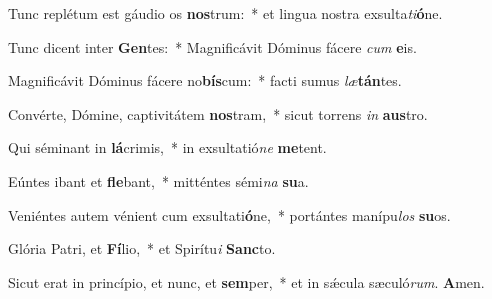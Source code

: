 Tunc replétum est gáudio os \textbf{nos}trum:~* et lingua nostra exsulta\textit{ti}\textbf{ó}ne.

Tunc dicent inter \textbf{Gen}tes:~* Magnificávit Dóminus fácere \textit{cum} \textbf{e}is.

Magnificávit Dóminus fácere no\textbf{bís}cum:~* facti sumus \textit{læ}\textbf{tán}tes.

Convérte, Dómine, captivitátem \textbf{nos}tram,~* sicut torrens \textit{in} \textbf{aus}tro.

Qui séminant in \textbf{lá}crimis,~* in exsultatió\textit{ne} \textbf{me}tent.

Eúntes ibant et \textbf{fle}bant,~* mitténtes sémi\textit{na} \textbf{su}a.

Veniéntes autem vénient cum exsultati\textbf{ó}ne,~* portántes manípu\textit{los} \textbf{su}os.

Glória Patri, et \textbf{Fí}lio,~* et Spirítu\textit{i} \textbf{Sanc}to.

Sicut erat in princípio, et nunc, et \textbf{sem}per,~* et in sǽcula sæculó\textit{rum}. \textbf{A}men.

